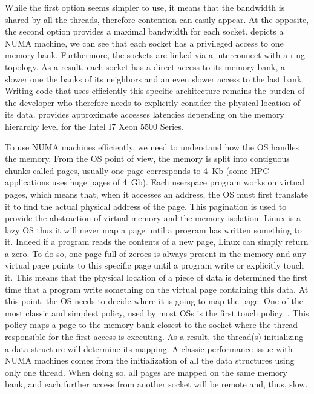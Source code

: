 While the first option seems simpler to use, it means that the bandwidth is shared by all the threads, therefore contention can easily appear.
At the opposite, the second option provides a maximal bandwidth for each socket.
 depicts a \gls{NUMA} machine, we can see that each socket has a privileged access to one memory bank.
Furthermore, the sockets are linked via a interconnect with a ring topology.
As a result, each socket  has a direct access to its memory bank, a slower one the banks of its neighbors and an even slower access to the last bank.
Writing code that uses efficiently this specific architecture remains the burden of the developer who therefore needs to explicitly consider the physical location of its data.
 provides approximate accesses latencies depending on the memory hierarchy level for  the \gls{Intel} I7 Xeon 5500 Series.

To use \gls{NUMA} machines efficiently, we need to understand how the \gls{OS} handles the memory.
From the \gls{OS} point of view, the memory is split into contiguous chunks called pages, usually one page corresponds to \SI{4}{Kb} (some \gls{HPC} applications uses huge pages of \SI{4}{Gb}).
Each userspace program works on virtual pages, which means that, when it accesses an address, the \gls{OS} must first translate it to find the actual physical address of the page.
This pagination is used to provide the abstraction of virtual memory and the memory isolation.
\gls{Linux} is a lazy \gls{OS} thus it will never map a page until a program has written something to it.
Indeed if a program reads the contents of a new page, \gls{Linux} can simply return a zero.
To do so, one page full of zeroes is always present in the memory and any virtual page points to this specific page until a program write or explicitly touch it.
This means that the physical location of a piece of data is determined the first time that a program write something on the virtual page containing this data.
At this point, the \gls{OS} needs to decide where it is going to map the page.
One of the most classic and simplest policy, used by most \glspl{OS} is the first touch policy~\cite{Marchetti95Using}.
This policy maps a page to the memory bank closest to the socket where the thread responsible for the first access is executing.
As a result, the thread(s) initializing a data structure will determine its mapping.
A classic performance issue with \gls{NUMA} machines comes from the initialization of all the data structures using only one thread.
When doing so, all pages are mapped on the same memory bank, and each further access from another socket will be remote and, thus, slow.

